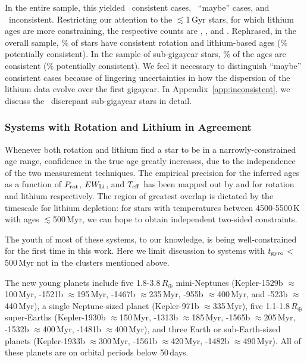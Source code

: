 \documentclass[11pt,twocolumn,tighten]{aastex63}
\begin{document}
In the entire sample, this yielded 
\allagesyesconsistent\ consistent cases,
\allagesmaybeconsistent\ ``maybe'' cases, and
\allagesnoconsistent\ inconsistent.
Restricting our attention to the $\lesssim$1\,Gyr stars, for which
lithium ages are more constraining,
the respective counts are
\minageltonegyryesconsistent, \minageltonegyrmaybeconsistent, and
\minageltonegyrnoconsistent.
Rephrased, in the overall sample, \fracconsistentallages\%
of stars have consistent rotation and lithium-based ages
(\fracpotentiallyconsistentallages\% potentially consistent).
In the sample of sub-gigayear stars,
\fracconsistentminageltonegyr\% of the ages are
consistent (\fracpotentiallyconsistentminageltonegyr\% potentially
consistent).
We feel it necessary to distinguish ``maybe'' consistent cases because
of lingering uncertainties in how the dispersion of the lithium data
evolve over the first gigayear.
In Appendix~\ref{app:inconsistent}, we discuss the
\minageltonegyrnoconsistent\ discrepant sub-gigayear stars in detail.



\subsubsection{Systems with Rotation and Lithium in Agreement}
%
Whenever both rotation and lithium find a star to be in a
narrowly-constrained age range, confidence in the true age greatly
increases, due to the independence of the two measurement techniques.
The empirical precision for the inferred ages as a function of $P_{\rm
rot}$, $EW_{\rm Li}$, and $T_{\rm eff}$ has been mapped out by
\citet{Bouma_2023} and \citet{Jeffries_2023} for rotation and lithium
respectively.  The region of greatest overlap is dictated by the
timescale for lithium depletion: for stars with temperatures between
4500-5500\,K with ages $\lesssim$500\,Myr, we can hope to obtain
independent two-sided constraints.

The youth of most of these systems, to our knowledge, is being
well-constrained for the first time in this work.  Here we limit
discussion to systems with $t_{\rm gyro}$$<$500\,Myr not in the clusters
mentioned above.

The new young planets
include five 1.8-3.8\,$R_\oplus$ mini-Neptunes
(Kepler-1529b $\approx$100\,Myr,
-1521b $\approx$195\,Myr,
-1467b $\approx$235\,Myr,
-955b $\approx$400\,Myr, and
-523b $\approx$440\,Myr),
a single Neptune-sized planet
(Kepler-971b $\approx$335\,Myr),
five 1.1-1.8\,$R_\oplus$ super-Earths
(Kepler-1930b $\approx$150\,Myr,
-1313b $\approx$185\,Myr,
-1565b $\approx$205\,Myr,
-1532b $\approx$400\,Myr,
-1481b $\approx$400\,Myr),
and three Earth or sub-Earth-sized planets
(Kepler-1933b $\approx$300\,Myr,
-1561b $\approx$420\,Myr,
-1482b $\approx$490\,Myr).
All of these planets are on orbital periods below 50\,days.
\end{document}
